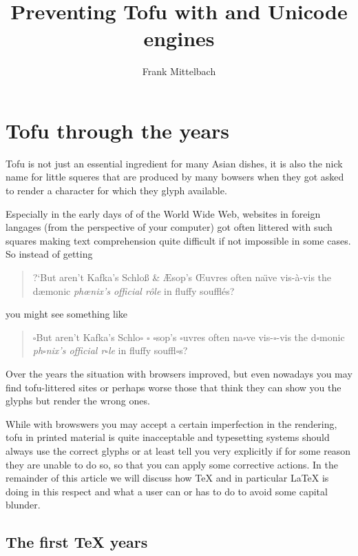 \documentclass{ltugboat}
\author{Frank Mittelbach}
\title{Preventing Tofu with \pdfTeX{} and Unicode engines}
\newcommand\tofu{$\square$}
\begin{document}
\maketitle

\begin{abstract}

\end{abstract}

\tableofcontents

\section{Tofu through the years}

Tofu is not just an essential ingredient for many Asian dishes, it is
also the nick name for little squeres that are produced by many
bowsers when they got asked to render a character for which they glyph
available.

Especially in the early days of of the World Wide Web,
websites in foreign langages (from the perspective of your computer)
got often littered with such squares making text comprehension quite
difficult if not impossible in some cases. So instead of getting
\begin{quote}
  ?`But aren't Kafka's Schlo{\ss} \&
  {\AE}sop's {\OE}uvres often na{\"\i}ve vis-\`{a}-vis the d{\ae}monic
  \textit{ph{\oe}nix's official r\^{o}le} in fluffy souffl\'{e}s?
\end{quote}
you might see something like
\begin{quote}
  \tofu But aren't Kafka's Schlo{\tofu} \tofu{} {\tofu}sop's
  \tofu{}uvres often na{\tofu}ve vis-\tofu{}-vis the d{\tofu}monic
  \textit{ph{\tofu}nix's official r\tofu{}le} in fluffy
  souffl\tofu{}s?
\end{quote}
Over the years the situation with browsers improved, but even nowadays
you may find tofu-littered sites or perhaps worse those that think they
can show you the glyphs but render the wrong ones.

While with browswers you may accept a certain imperfection in the
rendering, tofu in printed material is quite inacceptable and
typesetting systems should always use the correct glyphs or at least
tell you very explicitly if for some reason they are unable to do so,
so that you can apply some corrective actions. In the remainder of
this article we will discuss how \TeX{} and in particular \LaTeX{} is
doing in this respect and what a user can or has to do to avoid some
capital blunder.

\subsection{The first \TeX{} years}
\end{document}
